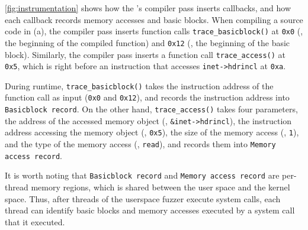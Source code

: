 \autoref{fig:instrumentation} shows how the \sys's compiler pass
inserts callbacks, and how each callback records memory accesses and
basic blocks.
%
When compiling a source code in (a), the compiler pass inserts
function calls \texttt{trace_basicblock()} at \texttt{0x0} (\ie, the
beginning of the compiled function) and \texttt{0x12} (\ie, the
beginning of the basic block).
%
Similarly, the compiler pass inserts a function call
\texttt{trace_access()} at \texttt{0x5}, which is right before an
instruction that accesses \texttt{inet->hdrincl} at \texttt{0xa}.


During runtime, \texttt{trace_basicblock()} takes the instruction
address of the function call as input (\ie \texttt{0x0} and
\texttt{0x12}), and records the instruction address into
\texttt{Basicblock record}.
%
On the other hand, \texttt{trace_access()} takes four parameters, the
address of the accessed memory object (\ie, \texttt{\&inet->hdrincl}),
the instruction address accessing the memory object (\ie,
\texttt{0x5}), the size of the memory access (\ie, \texttt{1}), and
the type of the memory access (\ie, \texttt{read}), and records them
into \texttt{Memory access record}.






It is worth noting that \texttt{Basicblock record} and \texttt{Memory
  access record} are per-thread memory regions, which is shared
between the user space and the kernel space. Thus, after threads of
the userspace fuzzer execute system calls, each thread can identify
basic blocks and memory accesses executed by a system call that it
executed.










